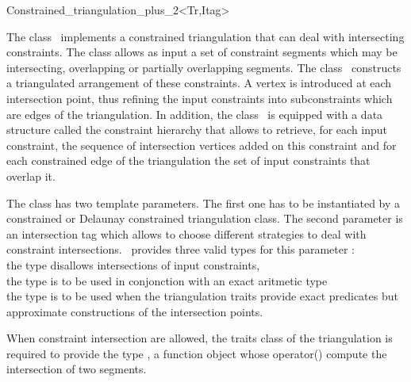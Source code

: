 

\begin{ccRefClass}{Constrained_triangulation_plus_2<Tr,Itag>}  %


The class \ccRefName\ implements a constrained triangulation that 
can deal with intersecting constraints. 
The class allows as input a set of constraint segments which may be
intersecting, overlapping or partially
overlapping segments. 
The class \ccRefName\ constructs a triangulated arrangement
of these constraints.
A vertex is introduced at each intersection point,
thus refining the input constraints into subconstraints
which are edges of the triangulation.
In addition, the class \ccRefName\ is equipped
with a data structure called  the constraint hierarchy that
 allows to retrieve, 
for each input constraint, the 
sequence of intersection vertices added on this constraint
and for each constrained edge of the
triangulation the set of input constraints that overlap it.

The class has two template parameters.  The first one has to be
instantiated by a constrained or Delaunay constrained triangulation
class. The second parameter is an intersection tag
 which allows to choose different
strategies to deal with constraint intersections. 
\cgal\ provides three valid types for this parameter : \\
the type  disallows intersections of
 input constraints,\\
the type  is to be used in conjonction
with an exact aritmetic type \\
the type  is to be used when the triangulation traits
provide exact predicates but approximate constructions of the
intersection points.

When constraint intersection are allowed, the traits class of the
triangulation is required to provide the type
,  a function object whose operator()
compute the intersection of two segments.



\end{ccRefClass}

